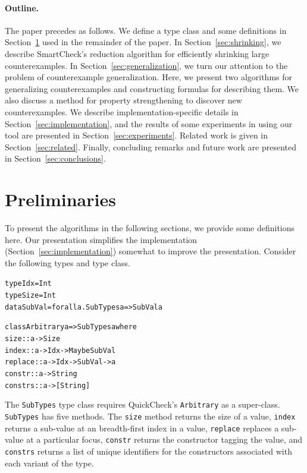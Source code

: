 \documentclass[10pt]{sigplanconf}
\newenvironment{code}{\begin{alltt}}{\end{alltt}}
\newcommand{\ttp}[1]{\texttt{#1}}
\begin{document}
\paragraph{Outline.}
The paper precedes as follows.  We define a type class and some definitions in
Section~\ref{sec:preliminaries} used in the remainder of the paper.  In
Section~\ref{sec:shrinking}, we describe SmartCheck's reduction algorithm for
efficiently shrinking large counterexamples.  In
Section~\ref{sec:generalization}, we turn our attention to the problem of
counterexample generalization.  Here, we present two algorithms for generalizing
counterexamples and constructing formulas for describing them.  We also discuss
a method for property strengthening to discover new counterexamples.  We
describe implementation-specific details in Section~\ref{sec:implementation},
and the results of some experiments in using our tool are presented in
Section~\ref{sec:experiments}.  Related work is given in
Section~\ref{sec:related}.  Finally, concluding remarks and future work are
presented in Section~\ref{sec:conclusions}.


\section{Preliminaries}\label{sec:preliminaries}

To present the algorithms in the following sections, we provide some definitions
here.  Our presentation simplifies the implementation
(Section~\ref{sec:implementation}) somewhat to improve the presentation.
Consider the following types and type class.
%
\begin{code}
type Idx    = Int
type Size   = Int
data SubVal = forall a. SubTypes a => SubVal a

class Arbitrary a => SubTypes a where
  size    :: a -> Size
  index   :: a -> Idx -> Maybe SubVal
  replace :: a -> Idx -> SubVal -> a
  constr  :: a -> String
  constrs :: a -> [String]
\end{code}
%
\noindent
The \ttp{SubTypes} type class requires QuickCheck's \ttp{Arbitrary} as a
super-class.  \ttp{SubTypes} has five methods.  The \ttp{size} method returns
the size of a value, \ttp{index} returns a sub-value at an breadth-first index
in a value, \ttp{replace} replaces a sub-value at a particular focus,
\ttp{constr} returns the constructor tagging the value, and \ttp{constrs}
returns a list of unique identifiers for the constructors associated with each
variant of the type.
\end{document}
